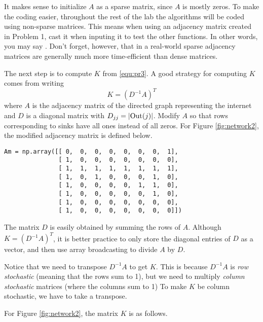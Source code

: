 \begin{info}
It makes sense to initialize $A$ as a sparse matrix, since $A$ is mostly zeros. To make the coding easier, throughout the rest of the lab the algorithms will be coded using non-sparse matrices. This means when using an adjacency matrix created in Problem 1, cast it  when inputing it to test the other functions. In other words, you may say . Don't forget, however, that in a real-world sparse adjacency matrices are generally much more time-efficient than dense matrices.
\end{info}

The next step is to compute $K$ from \eqref{equ:pr3}.
A good strategy for computing $K$ comes from writing
\[
K = (D^{-1}A)^T
\]
where $A$ is the adjacency matrix of the directed graph representing the internet and $D$ is a diagonal matrix with $D_{jj}=\left\lvert\operatorname{Out}(j)\right\rvert$.
Modify $A$ so that rows corresponding to sinks have all ones instead of all zeros.
For Figure \ref{fig:network2}, the modified adjacency matrix is defined below.
\begin{lstlisting}
Am = np.array([[ 0,  0,  0,  0,  0,  0,  0,  1],
               [ 1,  0,  0,  0,  0,  0,  0,  0],
               [ 1,  1,  1,  1,  1,  1,  1,  1],
               [ 1,  0,  1,  0,  0,  0,  1,  0],
               [ 1,  0,  0,  0,  0,  1,  1,  0],
               [ 1,  0,  0,  0,  0,  0,  1,  0],
               [ 1,  0,  0,  0,  0,  0,  0,  0],
               [ 1,  0,  0,  0,  0,  0,  0,  0]])
\end{lstlisting}


The matrix $D$ is easily obtained by summing the rows of $A$.
Although  $K=(D^{-1}A)^T$, it is better practice to only store the diagonal entries of $D$ as a vector, and then use array broadcasting to divide $A$ by $D$.

Notice that we need to transpose $D^{-1}A$ to get $K$. This is because $D^{-1}A$ is \emph{row stochastic} (meaning that  the rows sum to 1), but we need to multiply \emph{column stochastic} matrices (where the columns sum to 1) To make $K$ be column stochastic, we have to take a transpose.

For Figure \ref{fig:network2}, the matrix $K$ is as follows.

